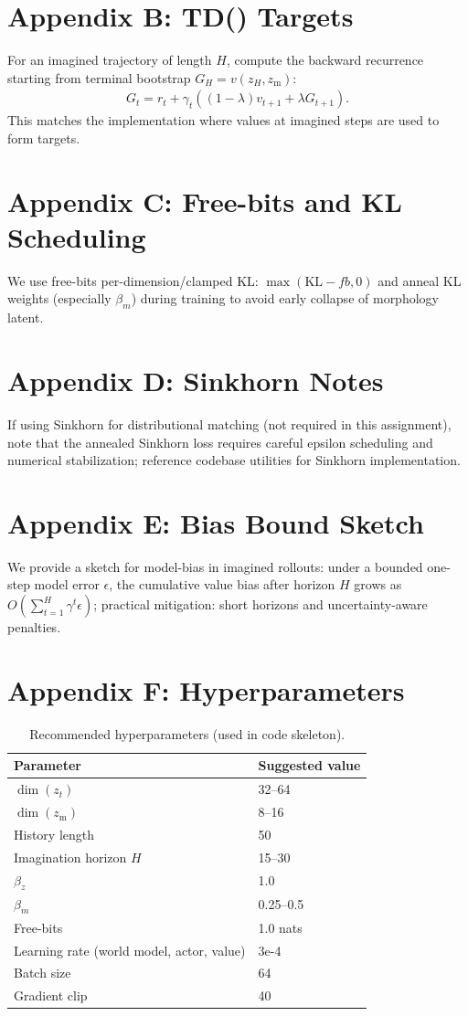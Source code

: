 \documentclass{article}
\begin{document}
\section{Appendix B: TD(\lambda) Targets}
For an imagined trajectory of length $H$, compute the backward recurrence starting from terminal bootstrap $G_H = v(z_H,z_{\mathrm{m}})$:
\begin{align}
G_t = r_t + \gamma_t((1-\lambda)v_{t+1} + \lambda G_{t+1}).
\end{align}
This matches the implementation where values at imagined steps are used to form targets.

\section{Appendix C: Free-bits and KL Scheduling}
We use free-bits per-dimension/clamped KL: $\max(\mathrm{KL}-fb,0)$ and anneal KL weights (especially $\beta_m$) during training to avoid early collapse of morphology latent.

\section{Appendix D: Sinkhorn Notes}
If using Sinkhorn for distributional matching (not required in this assignment), note that the annealed Sinkhorn loss requires careful epsilon scheduling and numerical stabilization; reference codebase utilities for Sinkhorn implementation.

\section{Appendix E: Bias Bound Sketch}
We provide a sketch for model-bias in imagined rollouts: under a bounded one-step model error $\epsilon$, the cumulative value bias after horizon $H$ grows as $O(\sum_{t=1}^H \gamma^t \epsilon)$; practical mitigation: short horizons and uncertainty-aware penalties.

\section{Appendix F: Hyperparameters}
\begin{table}[h]
\centering
\begin{tabular}{ll}
\toprule
Parameter & Suggested value \\
\midrule
$\dim(z_t)$ & 32--64 \\
$\dim(z_{\mathrm{m}})$ & 8--16 \\
History length & 50 \\
Imagination horizon $H$ & 15--30 \\
$\beta_z$ & 1.0 \\
$\beta_m$ & 0.25--0.5 \\
Free-bits & 1.0 nats \\
Learning rate (world model, actor, value) & 3e-4 \\
Batch size & 64 \\
Gradient clip & 40 \\
\bottomrule
\end{tabular}
\caption{Recommended hyperparameters (used in code skeleton).}
\end{table}
\end{document}
